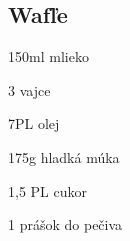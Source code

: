 \setcounter{step}{0}
\subsection{Wafľe}

\begin{ingredient}
\begin{main}
	\item 150ml mlieko
	\item 3 vajce
	\item 7PL olej
	\item 175g hladká múka
	\item 1,5 PL cukor
	\item 1 prášok do pečiva
\end{main}
\end{ingredient}%
\begin{recipe}




\end{recipe}

\begin{notes}

\end{notes}	